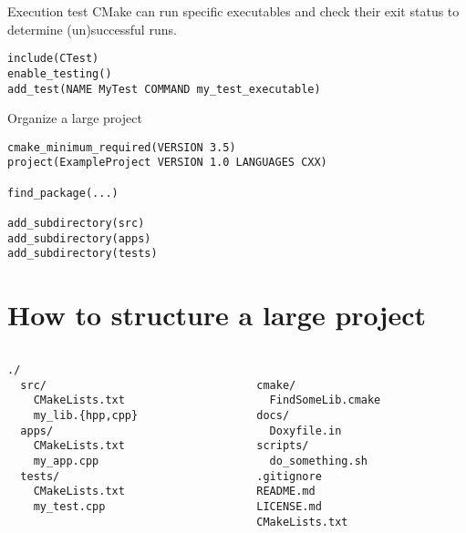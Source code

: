 \documentclass[aspectratio=169,11pt]{beamer}
\begin{document}
\begin{frame}[fragile]{Execution test}
CMake can run specific executables and check their exit status to determine (un)successful runs.
\begin{verbatim}
include(CTest)
enable_testing()
add_test(NAME MyTest COMMAND my_test_executable)
\end{verbatim}
\end{frame}

\begin{frame}[fragile]{Organize a large project}
\begin{verbatim}
cmake_minimum_required(VERSION 3.5)
project(ExampleProject VERSION 1.0 LANGUAGES CXX)

find_package(...)

add_subdirectory(src)
add_subdirectory(apps)
add_subdirectory(tests)
\end{verbatim}
\end{frame}

\section{How to structure a large project}
\begin{frame}
\Large
\begin{columns}[t]
    \begin{column}{0.5\textwidth}
        \begin{verbatim}
./
  src/
    CMakeLists.txt
    my_lib.{hpp,cpp}
  apps/
    CMakeLists.txt
    my_app.cpp
  tests/
    CMakeLists.txt
    my_test.cpp
        \end{verbatim}
    \end{column}
    \begin{column}{0.5\textwidth}
        \begin{verbatim}

  cmake/
    FindSomeLib.cmake
  docs/
    Doxyfile.in
  scripts/
    do_something.sh
  .gitignore
  README.md
  LICENSE.md
  CMakeLists.txt
        \end{verbatim}
    \end{column}
\end{columns}
\end{frame}
\addtocounter{framenumber}{1}
\end{document}
